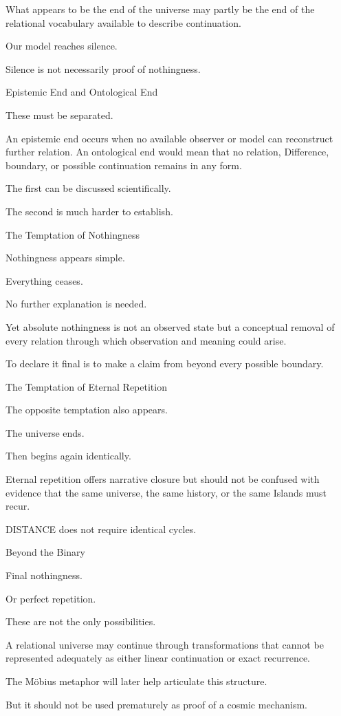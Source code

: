 What appears to be the end of the universe may partly be the end of the relational vocabulary available to describe continuation.

Our model reaches silence.

Silence is not necessarily proof of nothingness.

Epistemic End and Ontological End

These must be separated.

An epistemic end occurs when no available observer or model can reconstruct further relation. An ontological end would mean that no relation, Difference, boundary, or possible continuation remains in any form.

The first can be discussed scientifically.

The second is much harder to establish.

The Temptation of Nothingness

Nothingness appears simple.

Everything ceases.

No further explanation is needed.

Yet absolute nothingness is not an observed state but a conceptual removal of every relation through which observation and meaning could arise.

To declare it final is to make a claim from beyond every possible boundary.

The Temptation of Eternal Repetition

The opposite temptation also appears.

The universe ends.

Then begins again identically.

Eternal repetition offers narrative closure but should not be confused with evidence that the same universe, the same history, or the same Islands must recur.

DISTANCE does not require identical cycles.

Beyond the Binary

Final nothingness.

Or perfect repetition.

These are not the only possibilities.

A relational universe may continue through transformations that cannot be represented adequately as either linear continuation or exact recurrence.

The Möbius metaphor will later help articulate this structure.

But it should not be used prematurely as proof of a cosmic mechanism.

